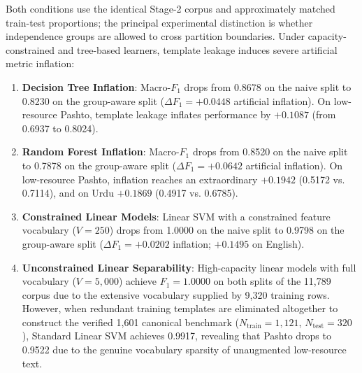\documentclass[11pt,a4paper]{article}
\begin{document}
Both conditions use the identical Stage-2 corpus and approximately matched train-test proportions; the principal experimental distinction is whether independence groups are allowed to cross partition boundaries. Under capacity-constrained and tree-based learners, template leakage induces severe artificial metric inflation:
\begin{enumerate}
    \item \textbf{Decision Tree Inflation}: Macro-$F_1$ drops from 0.8678 on the naive split to 0.8230 on the group-aware split ($\Delta F_1 = +0.0448$ artificial inflation). On low-resource Pashto, template leakage inflates performance by $\mathbf{+0.1087}$ (from 0.6937 to 0.8024).
    \item \textbf{Random Forest Inflation}: Macro-$F_1$ drops from 0.8520 on the naive split to 0.7878 on the group-aware split ($\Delta F_1 = +0.0642$ artificial inflation). On low-resource Pashto, inflation reaches an extraordinary $\mathbf{+0.1942}$ (0.5172 vs. 0.7114), and on Urdu $\mathbf{+0.1869}$ (0.4917 vs. 0.6785).
    \item \textbf{Constrained Linear Models}: Linear SVM with a constrained feature vocabulary ($V = 250$) drops from 1.0000 on the naive split to 0.9798 on the group-aware split ($\Delta F_1 = +0.0202$ inflation; $+0.1495$ on English).
    \item \textbf{Unconstrained Linear Separability}: High-capacity linear models with full vocabulary ($V = 5,000$) achieve $F_1 = 1.0000$ on both splits of the 11,789 corpus due to the extensive vocabulary supplied by 9,320 training rows. However, when redundant training templates are eliminated altogether to construct the verified 1,601 canonical benchmark ($N_{\text{train}} = 1,121$, $N_{\text{test}} = 320$), Standard Linear SVM achieves 0.9917, revealing that Pashto drops to 0.9522 due to the genuine vocabulary sparsity of unaugmented low-resource text.
\end{enumerate}
\end{document}
